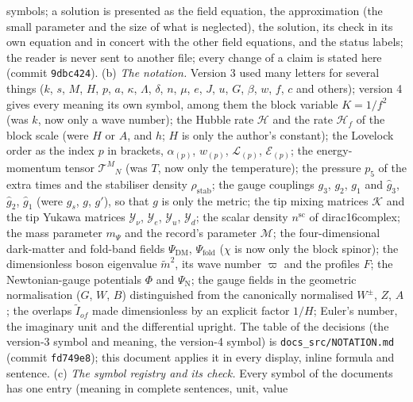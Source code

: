 \documentclass[
  10pt,
]{article}
\begin{document}
\begin{enumerate}
  symbols; a solution is presented as the field equation, the
  approximation (the small parameter and the size of what is neglected),
  the solution, its check in its own equation and in concert with the
  other field equations, and the status labels; the reader is never sent
  to another file; every change of a claim is stated here (commit
  \texttt{9dbc424}). (b) \emph{The notation.} Version 3 used many
  letters for several things (\(k\), \(s\), \(M\), \(H\), \(p\), \(a\),
  \(\kappa\), \(\Lambda\), \(\delta\), \(n\), \(\mu\), \(e\), \(J\),
  \(u\), \(G\), \(\beta\), \(w\), \(f\), \(c\) and others); version 4
  gives every meaning its own symbol, among them the block variable
  \(K = 1/f^2\) (was \(k\), now only a wave number); the Hubble rate
  \(\mathcal{H}\) and the rate \(\mathcal{H}_f\) of the block scale
  (were \(H\) or \(A\), and \(h\); \(H\) is only the author's constant);
  the Lovelock order as the index \(p\) in brackets, \(\alpha_{(p)}\),
  \(w_{(p)}\), \(\mathcal{L}_{(p)}\), \(\mathcal{E}_{(p)}\); the
  energy-momentum tensor \(\mathcal{T}^M{}_N\) (was \(T\), now only the
  temperature); the pressure \(p_5\) of the extra times and the
  stabiliser density \(\rho_{\mathrm{stab}}\); the gauge couplings
  \(g_3\), \(g_2\), \(g_1\) and \(\hat g_3\), \(\hat g_2\), \(\hat g_1\)
  (were \(g_s\), \(g\), \(g'\)), so that \(g\) is only the metric; the
  tip mixing matrices \(\mathcal{K}\) and the tip Yukawa matrices
  \(\mathcal{Y}_\nu\), \(\mathcal{Y}_e\), \(\mathcal{Y}_u\),
  \(\mathcal{Y}_d\); the scalar density \(n^{\mathrm{sc}}\) of
  dirac16complex; the mass parameter \(m_\Psi\) and the record's
  parameter \(\mathcal{M}\); the four-dimensional dark-matter and
  fold-band fields \(\Psi_{\mathrm{DM}}\), \(\Psi_{\mathrm{fold}}\)
  (\(\chi\) is now only the block spinor); the dimensionless boson
  eigenvalue \(\tilde m^2\), its wave number \(\varpi\) and the profiles
  \(F\); the Newtonian-gauge potentials \(\Phi\) and
  \(\Psi_{\mathrm{N}}\); the gauge fields in the geometric normalisation
  (\(G\), \(W\), \(B\)) distinguished from the canonically normalised
  \(W^\pm\), \(Z\), \(A\); the overlaps \(\tilde I_{of}\) made
  dimensionless by an explicit factor \(1/H\); Euler's number, the
  imaginary unit and the differential upright. The table of the
  decisions (the version-3 symbol and meaning, the version-4 symbol) is
  \texttt{docs\_src/NOTATION.md} (commit \texttt{fd749e8}); this
  document applies it in every display, inline formula and sentence. (c)
  \emph{The symbol registry and its check.} Every symbol of the
  documents has one entry (meaning in complete sentences, unit, value

\end{enumerate}
\end{document}
